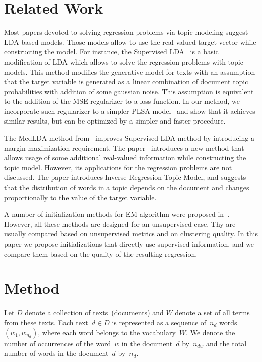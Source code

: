 \documentclass{sig-alternate-2013}
\begin{document}
\section{Related Work}
Most papers devoted to solving regression problems via topic modeling suggest LDA-based models.
Those models allow to use the real-valued target vector while constructing the model.
For instance, the Supervised LDA~\cite{blei07supervised} is a basic modification of LDA
which allows to solve the regression problems with topic models.
This method modifies the generative model for texts with an assumption
that the target variable is generated as a linear combination
of document topic probabilities with addition of some gaussian noise.
This assumption is equivalent to the addition of the MSE regularizer
to a loss function.
In our method, we incorporate such regularizer to a simpler PLSA model~\cite{hofmann99plsa}
and show that it achieves similar results, but can be optimized
by a simpler and faster procedure.

The MedLDA method from~\cite{zhu09medlda} improves Supervised LDA method by introducing a margin maximization requirement.
The paper~\cite{mimno08arbitrary} introduces a new method that allows usage of some additional
real-valued information while constructing the topic model.
However, its applications for the regression problems are not discussed.
The paper \cite{rabinovich14irtm} introduces Inverse Regression Topic Model,
and suggests that the distribution of words in a topic depends on the document and changes
proportionally to the value of the target variable.

A number of initialization methods for EM-algorithm were proposed in~\cite{meila98init, blomer13init}.
However, all these methods are designed for an unsupervised case.
Thy are usually compared based on unsupervised metrics and on clustering quality.
In this paper we propose initializations that directly use supervised information,
and we compare them based on the quality of the resulting regression.


\section{Method}
Let $D$ denote a collection of texts~(documents) and $W$ denote a set of all terms from these texts.
Each text~$d \in D$ is represented as a sequence of~$n_d$ words $(w_1, w_{n_d})$,
where each word belongs to the vocabulary~$W$.
We denote the number of occurrences of the word~$w$ in the document~$d$ by~$n_{dw}$
and the total number of words in the document~$d$ by~$n_d$.
\end{document}
